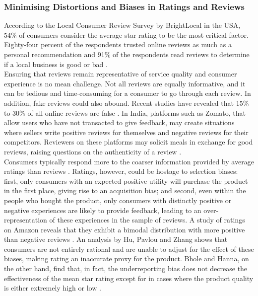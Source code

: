 \documentclass[a4paper, 12pt, twoside]{article}
\begin{document}
                    
                    \subsubsection{Minimising Distortions and Biases in Ratings and Reviews}
                    
                    According to the Local Consumer Review Survey by BrightLocal in the USA, 54\% of consumers consider the average star rating to be the most critical factor. Eighty-four percent of the respondents trusted online reviews as much as a personal recommendation and 91\% of the respondents read reviews to determine if a local business is good or bad \parencite{BrightLocal17}. \\ 

Ensuring that reviews remain representative of service quality and consumer experience is no mean challenge. Not all reviews are equally informative, and it can be tedious and time-consuming for a consumer to go through each review. In addition, fake reviews could also abound. Recent studies have revealed that 15\% to 30\% of all online reviews are false \parencite{ivanova2017can}. In India, platforms such as Zomato, that allow users who have not transacted to give feedback, may create situations where sellers write positive reviews for themselves and negative reviews for their competitors. Reviewers on these platforms may solicit meals in exchange for good reviews, raising questions on the authenticity of a review \parencite{ChaddahP}.\\

Consumers typically respond more to the coarser information provided by average ratings than reviews \parencite{dai2012optimal}. Ratings, however, could be hostage to selection biases: first, only consumers with an expected positive utility will purchase the product in the first place, giving rise to an acquisition bias; and second, even within the people who bought the product, only consumers with distinctly positive or negative experiences are likely to provide feedback, leading to an over-representation of these experiences in the sample of reviews. A study of ratings on Amazon reveals that they exhibit a bimodal distribution with more positive than negative reviews \parencite{luca2016fake}. An analysis by Hu, Pavlou and Zhang   shows that consumers are not entirely rational and are unable to adjust for the effect of these biases, making rating an inaccurate proxy for the product\parencite{hu2017self}. Bhole and Hanna, on the other hand, find that, in fact, the underreporting bias does not decrease the effectiveness of the mean star rating except for in cases where the product quality is either extremely high or low \parencite{bhole2017effectiveness}.\\
\end{document}
